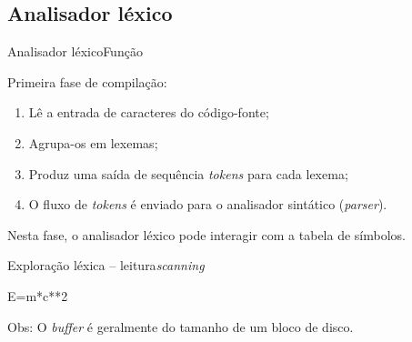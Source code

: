 \subsection{Analisador léxico}

\begin{frame}{Analisador léxico}{Função}

  Primeira fase de compilação:

  \begin{enumerate}
  \item Lê a entrada de caracteres do código-fonte;
  \item Agrupa-os em lexemas;
  \item Produz uma saída de sequência {\it tokens\/} para cada lexema;
  \item O fluxo de {\it tokens\/} é enviado para o analisador
    sintático ({\it parser\/}).
  \end{enumerate}\bigskip

  Nesta fase, o analisador léxico pode interagir com a tabela
  de símbolos.
\end{frame}

\begin{frame}{Exploração léxica -- leitura}{\it scanning\/}

\textvisiblespace\textvisiblespace\textvisiblespace E=m*c**2\\

\bigskip


\medskip

{\small Obs: O {\it buffer} é geralmente do tamanho de um bloco de disco.}

\end{frame}

